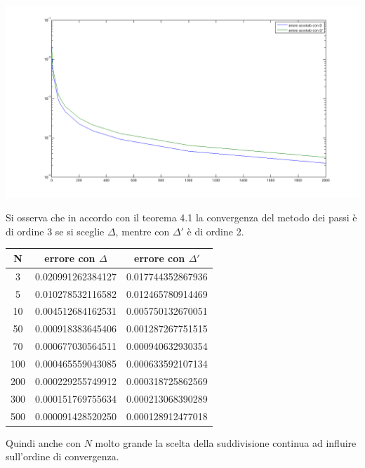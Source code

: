 \begin{exm}[\cite{4}]
\begin{center}
\includegraphics[width=15cm]{immagini/immagine11.png}
\end{center}

Si osserva che in accordo con il teorema 4.1 la convergenza del metodo dei passi è di ordine 3 se si sceglie $\Delta$, mentre con $\Delta'$ è di 
ordine 2.


\begin{center}
\begin{tabular}{|c|c|c|}
\hline
 N	&	errore con $\Delta$	&	errore con $\Delta'$	\\
\hline
3	&	0.020991262384127			&	0.017744352867936			\\
\hline
5	&	0.010278532116582			&	0.012465780914469			\\
\hline
10	&	0.004512684162531			&	0.005750132670051			\\
\hline
50	&	0.000918383645406			&	0.001287267751515			\\
\hline
70	&	0.000677030564511			&	0.000940632930354			\\
\hline
100	&	0.000465559043085			&	0.000633592107134			\\
\hline
200	&	0.000229255749912			&	0.000318725862569			\\
\hline
300	&	0.000151769755634			&	0.000213068390289			\\
\hline
500	&	0.000091428520250			&	0.000128912477018			\\
\hline
\end{tabular}
\end{center}

Quindi anche con $N$ molto grande la scelta della suddivisione continua ad influire sull'ordine di convergenza.
\end{exm}
